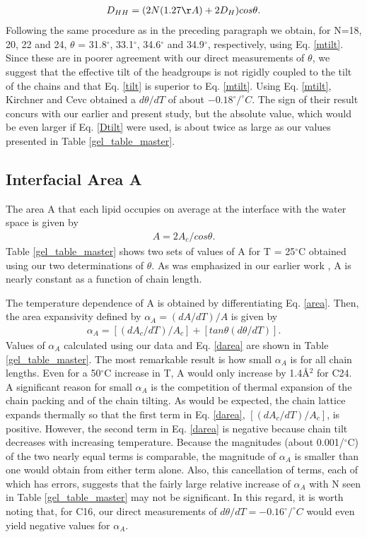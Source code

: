 \begin{eqnarray}
\label{mtilt}
D_{HH} = (2N(1.27\AA) + 2D_{H})cos{\theta}.
\end{eqnarray}
Following the same procedure as in the preceding paragraph we obtain,
for N=18, 20, 22 and 24, $\theta$ = 31.8$^{\circ}$, 33.1$^{\circ}$,
34.6$^{\circ}$ and 34.9$^{\circ}$, respectively, using Eq. \ref{mtilt}.  
Since these are in poorer agreement with our direct 
measurements of $\theta$, we suggest that the effective tilt 
of the headgroups is not rigidly coupled to the tilt of the chains
and that Eq. \ref{tilt} is superior to Eq. \ref{mtilt}.  Using
Eq. \ref{mtilt}, Kirchner and Cevc \cite{Kir94} obtained a 
$d{\theta}/dT$ of about $-0.18^{\circ}/^{\circ}C$.  The sign of their
result concurs with our earlier \cite{STN92} and 
present study, but
the absolute value, which would be even larger if Eq. \ref{Dtilt} were
used, is about twice as large as our values presented in 
Table \ref{gel_table_master}.

\subsection{Interfacial Area A}

The area A that each lipid occupies on average at the interface with
the water space is given by
\begin{eqnarray}
\label{area}
A = 2A_c/cos\theta .
\end{eqnarray}
Table \ref{gel_table_master} shows two sets of values of A for 
T = 25$^{\circ}$C obtained
using our two determinations of $\theta$.  
As was emphasized in 
our earlier
work \cite{STN92}, A is nearly constant as a 
function of chain length.

The temperature dependence of A is obtained by differentiating Eq. \ref{area}.
Then, the area expansivity defined by ${\alpha}_A = (dA/dT)/A$ is given by
\begin{eqnarray}
\label{darea}
{\alpha}_A = [(dA_c/dT)/A_c] + [tan{\theta}(d{\theta}/dT)] .
\end{eqnarray}
Values of ${\alpha}_A$ calculated using our data and Eq. \ref{darea}
 are shown in Table \ref{gel_table_master}.  The most remarkable result
is how small ${\alpha}_A$ is for all chain lengths.  Even for a
50$^{\circ}$C increase in T, A would only increase by 1.4\AA$^2$ for C24.
A significant reason for small ${\alpha}_A$ is the competition
of thermal expansion of the chain packing and of the chain tilting.
As would be expected, the chain lattice expands thermally so that
the first term in Eq. \ref{darea}, $[(dA_c/dT)/A_c]$, is positive.
However, the second term in Eq. \ref{darea} is negative because
chain tilt decreases with increasing temperature.  Because the
magnitudes (about 0.001/$^{\circ}$C) of the two nearly equal terms is 
comparable,
the magnitude of ${\alpha}_A$ is smaller than one would obtain
from either term alone.  Also, this cancellation of terms, each of which
has errors, suggests that the fairly large relative increase of
${\alpha}_A$ with N seen in Table \ref{gel_table_master} may not be 
significant.  In this
regard, it is worth noting that, for C16, our direct measurements 
of $d{\theta}/dT=-0.16^{\circ}/^{\circ}C$ would even yield negative 
values for ${\alpha}_A$.

